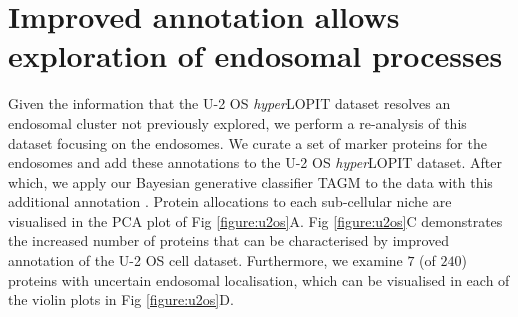 \documentclass[12pt,english]{article}
\begin{document}
\section*{Improved annotation allows exploration of endosomal processes}\label{section:endo}
Given the information that the U-2 OS \textit{hyper}LOPIT dataset resolves an endosomal cluster not previously explored, we perform a re-analysis of this dataset focusing on the endosomes. We curate a set of marker proteins for the endosomes and add these annotations to the U-2 OS \textit{hyper}LOPIT dataset. After which, we apply our Bayesian generative classifier TAGM to the data with this additional annotation \citep{Crook:2018}. Protein allocations to each sub-cellular niche are visualised in the PCA plot of Fig \ref{figure:u2os}A. Fig \ref{figure:u2os}C demonstrates the increased number of proteins that can be characterised by improved annotation of the U-2 OS cell dataset. Furthermore, we examine $7$ (of $240$) proteins with uncertain endosomal localisation, which can be visualised in each of the violin plots in Fig \ref{figure:u2os}D.
\end{document}
